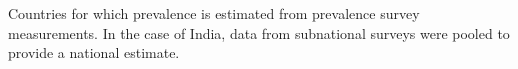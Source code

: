 \label{fig:ps}Countries for which prevalence is estimated from prevalence survey measurements. In the case of India, data from subnational surveys were pooled to provide a national estimate.